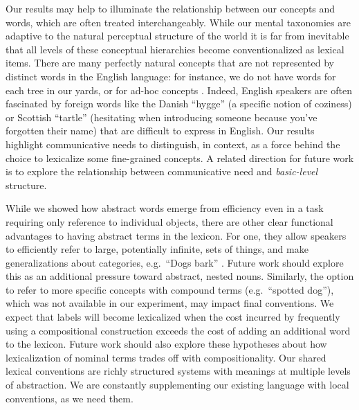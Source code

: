 Our results may help to illuminate the relationship between our concepts and words, which are often treated interchangeably. While our mental taxonomies are adaptive to the natural perceptual structure of the world \cite{MervisRosch81_CategorizationReview} %
it is far from inevitable that all levels of these conceptual hierarchies become conventionalized as lexical items. There are many perfectly natural concepts that are not represented by distinct words in the English language: for instance, we do not have words for each tree in our yards, or for ad-hoc concepts %
\cite{Barsalou83_AdHocCategories}. Indeed, English speakers are often fascinated by foreign words like the Danish ``hygge'' (a specific notion of coziness) or Scottish ``tartle'' (hesitating when introducing someone because you've forgotten their name) that are difficult to express in English.
Our results highlight communicative needs to distinguish, in context, as a force behind the choice to lexicalize some fine-grained concepts. 
A related direction for future work is to explore the relationship between communicative need and \emph{basic-level} structure.

While we showed how abstract words emerge from efficiency even in a task requiring only reference to individual objects, there are other clear functional advantages to having abstract terms in the lexicon. For one, they allow speakers to efficiently refer to large, potentially infinite, sets of things, and make generalizations about categories, e.g.\ ``Dogs bark'' \cite{TesslerGoodman16_Generics}. Future work should explore this as an additional pressure toward abstract, nested nouns.
Similarly, the option to refer to more specific concepts with compound terms (e.g.~``spotted dog''), which was not available in our experiment, may impact final conventions.
We expect that labels will become lexicalized when the cost incurred by frequently using a compositional construction exceeds the cost of adding an additional word to the lexicon. 
Future work should also explore these hypotheses about how lexicalization of nominal terms trades off with compositionality. 
Our shared lexical conventions are richly structured systems with meanings at multiple levels of abstraction. 
We are constantly supplementing our existing language with local conventions, as we need them.
